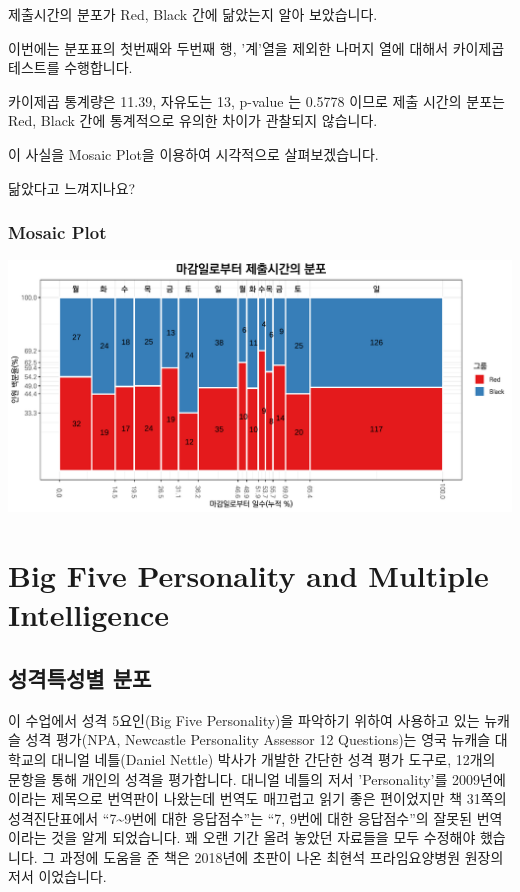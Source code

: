 \documentclass[
]{book}
\begin{document}
제출시간의 분포가 Red, Black 간에 닮았는지 알아 보았습니다.

이번에는 분포표의 첫번째와 두번째 행, '계'열을 제외한 나머지 열에 대해서 카이제곱테스트를 수행합니다.

카이제곱 통계량은 11.39, 자유도는 13, p-value 는 0.5778 이므로 제출 시간의 분포는 Red, Black 간에 통계적으로 유의한 차이가 관찰되지 않습니다.

이 사실을 Mosaic Plot을 이용하여 시각적으로 살펴보겠습니다.

닮았다고 느껴지나요?

\subsection{Mosaic Plot}\label{mosaic-plot-26}

\includegraphics{Quiz_report_2025_files/figure-latex/unnamed-chunk-352-1.pdf}

\chapter{Big Five Personality and Multiple Intelligence}\label{big-five-personality-and-multiple-intelligence}

\section{성격특성별 분포}\label{uxc131uxaca9uxd2b9uxc131uxbcc4-uxbd84uxd3ec}

이 수업에서 성격 5요인(Big Five Personality)을 파악하기 위하여 사용하고 있는 뉴캐슬 성격 평가(NPA, Newcastle Personality Assessor 12 Questions)는 영국 뉴캐슬 대학교의 대니얼 네틀(Daniel Nettle) 박사가 개발한 간단한 성격 평가 도구로, 12개의 문항을 통해 개인의 성격을 평가합니다. 대니얼 네틀의 저서 'Personality'를 2009년에 이라는 제목으로 번역판이 나왔는데 번역도 매끄럽고 읽기 좋은 편이었지만 책 31쪽의 성격진단표에서 ``7\textasciitilde9번에 대한 응답점수''는 ``7, 9번에 대한 응답점수''의 잘못된 번역이라는 것을 알게 되었습니다. 꽤 오랜 기간 올려 놓았던 자료들을 모두 수정해야 했습니다. 그 과정에 도움을 준 책은 2018년에 초판이 나온 최현석 프라임요양병원 원장의 저서 이었습니다.
\end{document}
